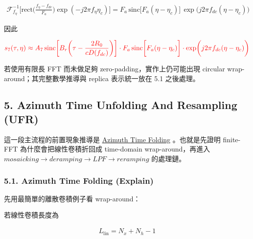\documentclass[10pt]{article}
\begin{document}
\begin{equation}
\begin{aligned}
\mathcal{F}^{-1}_{f_\eta} \biggl[
\mathrm{rect}\biggl(\frac{f_\eta-f_{dc}}{F_a}\biggr)\exp(-j2\pi f_\eta\eta_c)
\biggr] = F_a\,\mathrm{sinc}\biggl[F_a(\eta-\eta_c)\biggr]\,
\exp\biggl(j2\pi f_{dc}(\eta-\eta_c)\biggr)
\end{aligned}
\end{equation}

因此

\begin{equation}
\begin{aligned}
{\color{red}{s_7(\tau,\eta)\approx
A_7\,
\mathrm{sinc}\biggl[B_r\biggl(\tau-\frac{2R_0}{cD(f_{dc})}\biggr)\biggr]\cdot
F_a\,\mathrm{sinc}\biggl[F_a(\eta-\eta_c)\biggr]\cdot
\exp\biggl(j2\pi f_{dc}(\eta-\eta_c)\biggr)}}
\end{aligned}
\end{equation}

若使用有限長 FFT 而未做足夠 zero-padding，實作上仍可能出現 circular
wrap-around；其完整數學推導與 replica 表示統一放在 5.1 之後處理。

\hypertarget{azimuth-time-unfolding-and-resampling-ufr}{%
\subsection{5. Azimuth Time Unfolding And Resampling
(UFR)}\label{azimuth-time-unfolding-and-resampling-ufr}}

這一段主流程的前置現象推導是 \href{./azimuth_time_folding.md}{Azimuth
Time Folding} 。也就是先證明 finite-FFT 為什麼會把線性卷積折回成
time-domain wrap-around，再進入
\(mosaicking \rightarrow deramping \rightarrow LPF \rightarrow reramping\)
的處理鏈。

\hypertarget{azimuth-time-folding-explain}{%
\subsubsection{5.1. Azimuth Time Folding
(Explain)}\label{azimuth-time-folding-explain}}

先用最簡單的離散卷積例子看 wrap-around：

若線性卷積長度為

\begin{equation}
\begin{aligned} L_{\mathrm{lin}} = N_x + N_h - 1 \end{aligned}
\end{equation}
\end{document}
